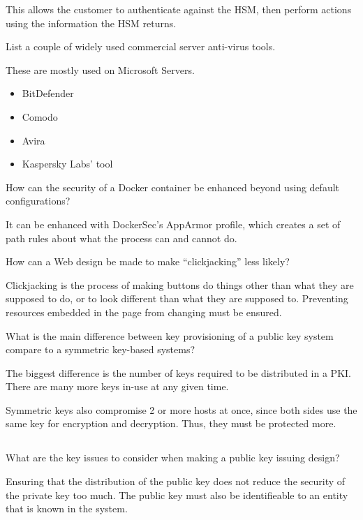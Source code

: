 \begin{questions}
\begin{solution}
    This allows the customer to authenticate against the HSM, then perform actions using the information the HSM returns.
  \end{solution}

\question{} List a couple of widely used commercial server anti-virus tools.
  \begin{solution}
    These are mostly used on Microsoft Servers.
    \begin{itemize}[noitemsep]
    \item BitDefender
    \item Comodo
    \item Avira
    \item Kaspersky Labs' tool
    \end{itemize}
  \end{solution}

\question{} How can the security of a Docker container be enhanced beyond using default configurations?
  \begin{solution}
    It can be enhanced with DockerSec's AppArmor profile, which creates a set of path rules about what the process can and cannot do.
  \end{solution}

\question{} How can a Web design be made to make ``clickjacking'' less likely?
  \begin{solution}
    Clickjacking is the process of making buttons do things other than what they are supposed to do, or to look different than what they are supposed to.
    Preventing resources embedded in the page from changing must be ensured.
  \end{solution}

\question{} What is the main difference between key provisioning of a public key system compare to a symmetric key-based systems?
  \begin{solution}
    The biggest difference is the number of keys required to be distributed in a PKI.\@
    There are many more keys in-use at any given time.

    Symmetric keys also compromise 2 or more hosts at once, since both sides use the same key for encryption and decryption.
    Thus, they must be protected more.
  \end{solution}

  \begin{parts}
  \part{} What are the key issues to consider when making a public key issuing design?
    \begin{solution}
      Ensuring that the distribution of the public key does not reduce the security of the private key too much.
      The public key must also be identifieable to an entity that is known in the system.
    \end{solution}


\end{parts}
\end{questions}
